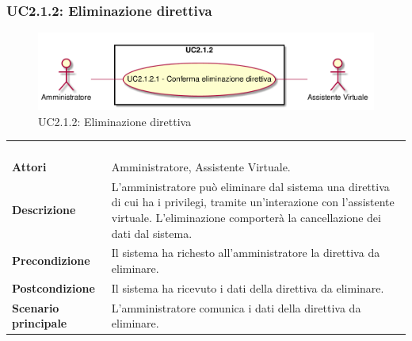 \newpage\subsubsection{UC2.1.2: Eliminazione direttiva }
\label{UC2.1.2}
\begin{figure}[h]
\centering
\includegraphics[width=\textwidth,height=\textheight,keepaspectratio]{images/UseCaseUC212.png}
\caption{UC2.1.2: Eliminazione direttiva }
\end{figure}
\begin{longtable}{l|p{10cm}}
\rowcolor[gray]{0.8} \multicolumn{2}{c}{} \\
\rowcolor[gray]{0.8} \multicolumn{2}{c}{\textbf{UC2.1.2 - Eliminazione direttiva }} \\
\rowcolor[gray]{0.8} \multicolumn{2}{c}{} \\
\hline
&\\
\textbf{Attori} & Amministratore, Assistente Virtuale.\\[7pt]
\textbf{Descrizione} & L'amministratore può eliminare dal sistema una direttiva di cui ha i privilegi, tramite un'interazione con l'assistente virtuale. L'eliminazione comporterà la cancellazione dei dati dal sistema.\\[7pt]
\textbf{Precondizione} & Il sistema ha richesto all'amministratore la direttiva da eliminare.\\[7pt]
\textbf{Postcondizione} & Il sistema ha ricevuto i dati della direttiva da eliminare.\\[7pt]
\textbf{Scenario principale} &L'amministratore comunica i dati della direttiva da eliminare.\\[7pt]\hline
\end{longtable}

